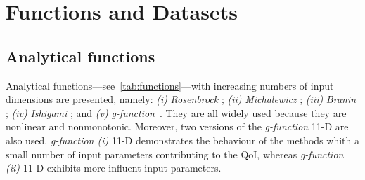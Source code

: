 
\chapter{Functions and Datasets}

\section{Analytical functions}
\label{sec:functions}

Analytical functions---see~\cref{tab:functions}---with increasing numbers of input dimensions are presented, namely: \textit{(i)} \textit{Rosenbrock} ; \textit{(ii)} \textit{Michalewicz} ; \textit{(iii)} \textit{Branin} ; \textit{(iv)} \textit{Ishigami} ; and \textit{(v)} \textit{g-function}~\cite{molga2005,ishigami1990,saltelli2007,legratiet2016,forrester2008a}. They are all widely used because they are nonlinear and nonmonotonic. Moreover, two versions of the \emph{g-function} 11-D are also used. \textit{g-function (i)} 11-D demonstrates the behaviour of the methods whith a small number of input parameters contributing to the QoI, whereas \textit{g-function (ii)} 11-D exhibits more influent input parameters.

